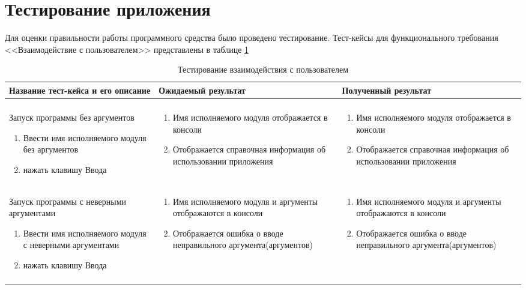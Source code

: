 \section{Тестирование приложения}
\label{sec:testing}

Для оценки правильности работы программного средства было проведено тестирование. Тест-кейсы для функционального требования <<Взаимодействие с пользователем>> представлены в таблице \ref{sec:testing:interaction_cases}



\begin{longtable}{| >{\centering}p{} | >{\centering}p{} | >{\centering\arraybackslash}p{}|}
  \caption{Тестирование взаимодействия с пользователем}
  \label{sec:testing:interaction_cases} \tabularnewline

  \hline
       Название тест-кейса и его описание & Ожидаемый результат  & Полученный результат \\
   \hline
   1 & 2 & 3 \\
   \hline
   Запуск программы без аргументов
   \begin{enumerate}
   \item Ввести имя исполняемого модуля без аргументов
   \item нажать клавишу Ввода
   \end{enumerate}
   &
   \begin{enumerate}
   \item Имя исполняемого модуля отображается в консоли
   \item Отображается справочная информация об использовании приложения
   \end{enumerate}
   &
   \begin{enumerate}
   \item Имя исполняемого модуля отображается в консоли
   \item Отображается справочная информация об использовании приложения
   \end{enumerate} \\
   \hline

   Запуск программы с неверными аргументами
   \begin{enumerate}
   \item Ввести имя исполняемого модуля с неверными аргументами
   \item нажать клавишу Ввода
   \end{enumerate}
   &
   \begin{enumerate}
   \item Имя исполняемого модуля и аргументы отображаются в консоли
   \item Отображается ошибка о вводе неправильного аргумента(аргументов)
   \end{enumerate}
   &
   \begin{enumerate}
   \item Имя исполняемого модуля и аргументы отображаются в консоли
   \item Отображается ошибка о вводе неправильного аргумента(аргументов)
   \end{enumerate} \\
   \pagebreak


\end{longtable}
